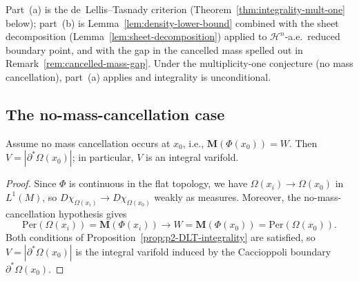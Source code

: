 Part~(a) is the de~Lellis--Tasnady criterion (Theorem~\ref{thm:integrality-mult-one} below); part~(b) is Lemma~\ref{lem:density-lower-bound} combined with the sheet decomposition (Lemma~\ref{lem:sheet-decomposition}) applied to $\mathcal{H}^n$-a.e.\ reduced boundary point, and with the gap in the cancelled mass spelled out in Remark~\ref{rem:cancelled-mass-gap}. Under the multiplicity-one conjecture (no mass cancellation), part~(a) applies and integrality is unconditional.

\subsection{The no-mass-cancellation case}\label{subsec:integrality-no-cancel}

\begin{theorem}\label{thm:integrality-mult-one}
Assume no mass cancellation occurs at $x_0$, i.e., $\mathbf{M}(\Phi(x_0)) = W$. Then $V = |\partial^*\Omega(x_0)|$; in particular, $V$ is an integral varifold.
\end{theorem}

\begin{proof}
Since $\Phi$ is continuous in the flat topology, we have $\Omega(x_i) \to \Omega(x_0)$ in $L^1(M)$, so $D\chi_{\Omega(x_i)} \to D\chi_{\Omega(x_0)}$ weakly as measures. Moreover, the no-mass-cancellation hypothesis gives
\[
\mathrm{Per}(\Omega(x_i)) = \mathbf{M}(\Phi(x_i)) \to W = \mathbf{M}(\Phi(x_0)) = \mathrm{Per}(\Omega(x_0)).
\]
Both conditions of Proposition~\ref{prop:p2-DLT-integrality} are satisfied, so $V = |\partial^*\Omega(x_0)|$ is the integral varifold induced by the Caccioppoli boundary $\partial^*\Omega(x_0)$.
\end{proof}

